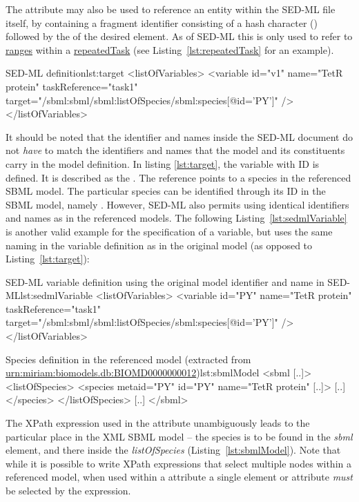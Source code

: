 The  attribute may also be used to reference an entity within the SED-ML file itself, by containing a fragment identifier consisting of a hash character (\code{\#}) followed by the  of the desired element. As of SED-ML \currentLV this is only used to refer to \hyperref[sec:ranges]{ranges} within a \hyperref[class:repeatedTask]{repeatedTask} (see Listing~\ref{lst:repeatedTask} for an example).


\begin{myXmlLst}{SED-ML  definition}{lst:target}
<listOfVariables>
	<variable id="v1" name="TetR protein" taskReference="task1" 
		target="/sbml:sbml/sbml:listOfSpecies/sbml:species[@id='PY']" />
</listOfVariables>
\end{myXmlLst}

It should be noted that the identifier and names inside the SED-ML document do not \emph{have} to match the identifiers and names that the model and its constituents carry in the model definition.
In listing \vref{lst:target}, the variable with ID  is defined. It is described as the . The reference points to a species in the referenced SBML model. The particular species can be identified through its ID in the SBML model, namely .
However, SED-ML also permits using identical identifiers and names as in the referenced models. The following Listing~\vref{lst:sedmlVariable} is another valid example for the specification of a variable, but uses the same naming in the variable definition as in the original model (as opposed to Listing~\ref{lst:target}):

\begin{myXmlLst}{SED-ML variable definition using the original model identifier and name in SED-ML}{lst:sedmlVariable}
<listOfVariables>
	<variable id="PY" name="TetR protein"  taskReference="task1" 
		target="/sbml:sbml/sbml:listOfSpecies/sbml:species[@id='PY']" />
</listOfVariables>
\end{myXmlLst}

\begin{myXmlLst}{Species definition in the referenced model (extracted from \url{urn:miriam:biomodels.db:BIOMD0000000012})}{lst:sbmlModel}
<sbml [..]>
	<listOfSpecies>
		<species metaid="PY" id="PY" name="TetR protein" [..]>
		[..]
		</species>
 	</listOfSpecies>
 	[..]
</sbml>
\end{myXmlLst}

The XPath expression used in the  attribute unambiguously leads to the particular place in the XML SBML model -- the species is to be found in the \emph{sbml} element, and there inside the \emph{listOfSpecies} (Listing~\vref{lst:sbmlModel}). Note that while it is possible to write XPath expressions that select multiple nodes within a referenced model, when used within a  attribute a single element or attribute \emph{must} be selected by the expression.


